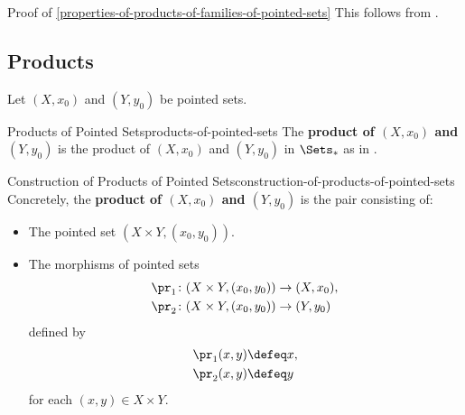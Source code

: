 \begin{Proof}{Proof of \cref{properties-of-products-of-families-of-pointed-sets}}%
    This follows from .
\end{Proof}
\subsection{Products}\label{subsection-products-of-pointed-sets}
Let $(X,x_{0})$ and $(Y,y_{0})$ be pointed sets.
\begin{definition}{Products of Pointed Sets}{products-of-pointed-sets}%
    The \textbf{product of $(X,x_{0})$ and $(Y,y_{0})$} is the product of $(X,x_{0})$ and $(Y,y_{0})$ in $\Sets_{*}$ as in .
\end{definition}
\begin{construction}{Construction of Products of Pointed Sets}{construction-of-products-of-pointed-sets}%
    Concretely, the \textbf{product of $(X,x_{0})$ and $(Y,y_{0})$} is the pair consisting of:
    \begin{itemize}
        \item{}The pointed set $(X\times Y,(x_{0},y_{0}))$.%
        \item{}The morphisms of pointed sets
            \begin{align*}
                \pr_{1} &\colon (X\times Y,(x_{0},y_{0}))\to(X,x_{0}),\\
                \pr_{2} &\colon (X\times Y,(x_{0},y_{0}))\to(Y,y_{0})
            \end{align*}
            defined by
            \begin{align*}
                \pr_{1}(x,y) &\defeq x,\\
                \pr_{2}(x,y) &\defeq y
            \end{align*}
            for each $(x,y)\in X\times Y$.
    \end{itemize}
\end{construction}
